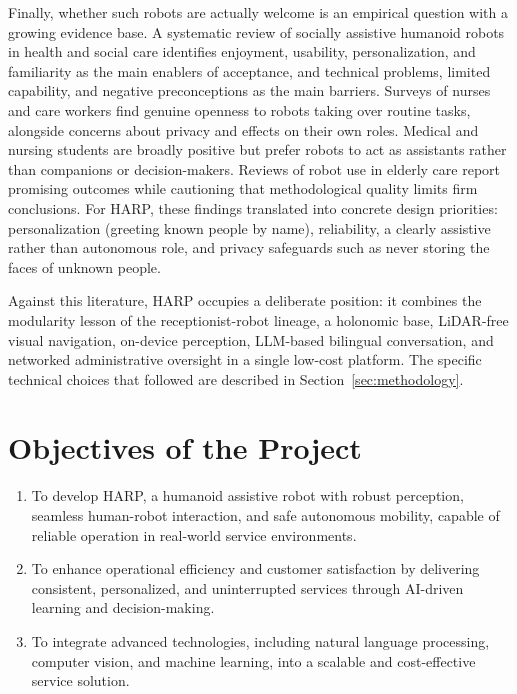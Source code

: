 \documentclass[11pt,a4paper]{article}
\begin{document}
Finally, whether such robots are actually welcome is an empirical question with a growing evidence base. A systematic review of socially assistive humanoid robots in health and social care identifies enjoyment, usability, personalization, and familiarity as the main enablers of acceptance, and technical problems, limited capability, and negative preconceptions as the main barriers. Surveys of nurses and care workers find genuine openness to robots taking over routine tasks, alongside concerns about privacy and effects on their own roles. Medical and nursing students are broadly positive but prefer robots to act as assistants rather than companions or decision-makers. Reviews of robot use in elderly care report promising outcomes while cautioning that methodological quality limits firm conclusions. For HARP, these findings translated into concrete design priorities: personalization (greeting known people by name), reliability, a clearly assistive rather than autonomous role, and privacy safeguards such as never storing the faces of unknown people.

Against this literature, HARP occupies a deliberate position: it combines the modularity lesson of the receptionist-robot lineage, a holonomic base, LiDAR-free visual navigation, on-device perception, LLM-based bilingual conversation, and networked administrative oversight in a single low-cost platform. The specific technical choices that followed are described in Section~\ref{sec:methodology}.

\section{Objectives of the Project}

\begin{enumerate}
\item To develop HARP, a humanoid assistive robot with robust perception, seamless human-robot interaction, and safe autonomous mobility, capable of reliable operation in real-world service environments.
\item To enhance operational efficiency and customer satisfaction by delivering consistent, personalized, and uninterrupted services through AI-driven learning and decision-making.
\item To integrate advanced technologies, including natural language processing, computer vision, and machine learning, into a scalable and cost-effective service solution.
\end{enumerate}
\end{document}
